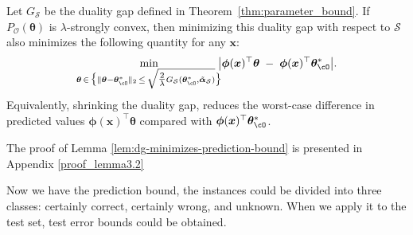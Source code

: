 \begin{lemma}
\label{lem:dg-minimizes-prediction-bound}
Let $G_{\mathcal{S}}$ be the duality gap defined in Theorem~\ref{thm:parameter_bound}. If $P_{\mathcal{O}}(\boldsymbol{\theta})$ is $\lambda$-strongly convex, then minimizing this duality gap with respect to $\mathcal{S}$ also minimizes the following quantity for any $\boldsymbol{x}$:
\begin{equation*}
  \min_{\boldsymbol{\theta} 
        \,\in\,
        \bigl\{
          \|\boldsymbol{\theta}
              -\bm \theta_{\cO}^*\|_2
          \,\le\,
          \sqrt{\tfrac{2}{\lambda}G_{\mathcal{S}}(\bm \theta_{\cO}^*, \tilde{\boldsymbol{\alpha}}_{\mathcal{S}})}
        \bigr\}}
   \!\!
   \bigl|\boldsymbol{\phi}(\boldsymbol{x})^{\top}\boldsymbol{\theta}
          \;-\;
          \boldsymbol{\phi}(\boldsymbol{x})^{\top}\bm \theta_{\cO}^*\bigr|.
\end{equation*}
Equivalently, shrinking the duality gap, reduces the worst-case difference in predicted values 
$\boldsymbol{\phi}(\boldsymbol{x})^{\top}\boldsymbol{\theta}$ 
compared with 
$\boldsymbol{\phi}(\boldsymbol{x})^{\top}\bm \theta_{\cO}^*$.
\end{lemma}

The proof of Lemma \ref{lem:dg-minimizes-prediction-bound} is presented in Appendix \ref{proof_lemma3.2}

Now we have the prediction bound, the instances could be divided into three classes: certainly correct, certainly wrong, and unknown. When we apply it to the test set, test error bounds could be obtained.



